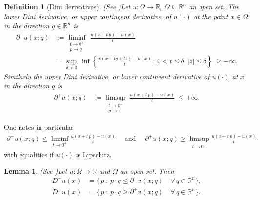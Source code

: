 \documentclass[12pt]{amsart}
\numberwithin{equation}{section}
\theoremstyle{plain}
\newtheorem{lemma}[theorem]{Lemma}
\newtheorem{definition}[theorem]{Definition}
\begin{document}
\begin{definition}[Dini derivatives] (See \cite[Definition III.2.36, page 125]{bardi1997optimal})\label{def app Dini}
Let $u:\Omega\to \mathbb{R}$, $\Omega\subseteq \mathbb{R}^{n}$ an open set. The lower Dini derivative, or upper contingent derivative, of $u(\cdot)$ at the point $x\in \Omega$ in the direction $q\in\mathbb{R}^{n}$ is
\begin{equation*}
\begin{aligned}
    \partial^{-}u(x;q) & := \liminf_{\substack{t \rightarrow 0^{+}\\p \rightarrow q}} \; \frac{u(x+t\,p) - u(x)}{t}\\
    & = \sup\limits_{\delta>0}\, \inf\left\{\frac{u(x+tq + tz) - u(x)}{t}\,:\, 0<t\leq \delta\,\;|z|\leq \delta\right\}\; \geq -\infty.
\end{aligned}
\end{equation*}
Similarly the upper Dini derivative, or lower contingent  derivative of $u(\cdot)$ at $x$ in the direction $q$ is
\begin{equation*}
\begin{aligned}
    \partial^{+}u(x;q) & := \limsup_{\substack{t \rightarrow 0^{+}\\p \rightarrow q}} \; \frac{u(x+t\,p) - u(x)}{t}\; \leq +\infty.
\end{aligned}
\end{equation*}
\end{definition}

One notes in particular
\begin{equation*}
\begin{aligned}
    \partial^{-}u(x;q) \leq \liminf\limits_{t\to 0^{+}} \frac{u(x+t\,p) - u(x)}{t} \quad \text{ and } \quad 
    \partial^{+}u(x;q) \geq \limsup\limits_{t\to 0^{+}} \frac{u(x +t\,p) - u(x)}{t}
\end{aligned}
\end{equation*}
with equalities if $u(\cdot)$ is Lipschitz. 

\begin{lemma}(See \cite[Lemma III.2.37, page 126]{bardi1997optimal})\label{lem app D partial}
Let $u:\Omega\to \mathbb{R}$ and $\Omega$ an open set. Then
\begin{equation*}
\begin{aligned}
    D^{-}u(x) & = \big\{\, p\,: \; p\cdot q \leq \partial^{-}u(x;q)\quad \forall\,q\in\mathbb{R}^{n}\big\},\\
    D^{+}u(x) & = \big\{\, p\,: \; p\cdot q \geq \partial^{+}u(x;q)\quad \forall\,q\in\mathbb{R}^{n}\big\}.
\end{aligned}
\end{equation*}
\end{lemma}
\end{document}
